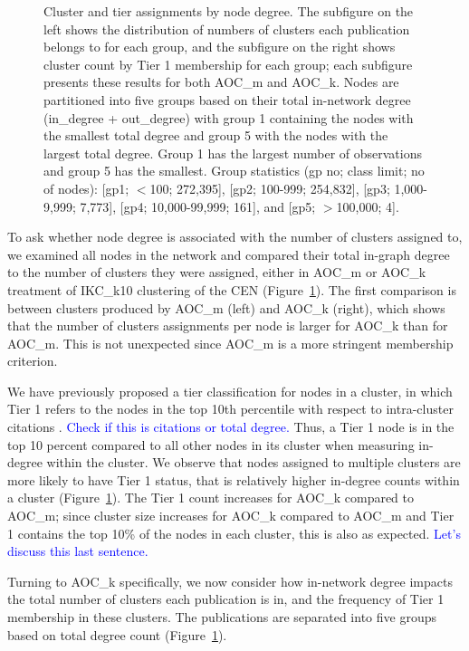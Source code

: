 \documentclass[12pt, oneside]{article}   	%
\begin{document}
\begin{figure}[H]
\begin{subfigure}[t]{0.48\textwidth}
    	\end{subfigure}
\captionsetup{width=0.9\textwidth}	
\caption{Cluster and tier assignments by node degree. The subfigure on the left shows the distribution of numbers of clusters each publication belongs to for each group, and the subfigure on the right shows cluster count by Tier 1 membership for each group; each subfigure presents these results for both AOC\_m and AOC\_k. Nodes are partitioned into five groups based on their total in-network degree (in\_degree + out\_degree) with group 1 containing the nodes with the smallest total degree and group 5 with the nodes with the largest total degree. Group 1 has the largest number of observations and group 5 has the smallest. Group statistics (gp no; class limit; no of nodes): [gp1; $<$100;  272,395], [gp2; 100-999; 254,832], [gp3; 1,000-9,999; 7,773], [gp4; 10,000-99,999; 161], and [gp5; $>$100,000; 4]. }
\label{fig:fig3}
\end{figure}


To ask whether node degree is associated with the number of clusters assigned to, we examined all nodes in the network and compared their total in-graph degree to the number of clusters they were assigned, either in AOC\_m or AOC\_k treatment of IKC\_k10 clustering of the CEN (Figure~\ref{fig:fig3}). The first comparison is between clusters produced by AOC\_m (left) and AOC\_k (right), which shows that the number of clusters assignments per node is larger for AOC\_k than for AOC\_m. This is not unexpected since AOC\_m is a more stringent membership criterion. 

We have previously proposed a tier classification for nodes in a cluster, in which Tier 1 refers to the nodes in the top 10th percentile with respect to intra-cluster citations \citep{Chandrasekharan2021}. 
\textcolor{blue}{Check if this is citations or total degree.}
Thus, a Tier 1 node is in the top 10 percent compared to all other nodes in its cluster when measuring in-degree within the cluster. We observe that nodes assigned to multiple clusters are more likely to have Tier 1 status, that is relatively higher in-degree counts within a cluster (Figure~\ref{fig:fig3}). The Tier 1 count increases for AOC\_k compared to AOC\_m; since cluster size  increases for AOC\_k compared to AOC\_m and Tier 1 contains the top 10\% of the nodes in each cluster, this is also as expected. \textcolor{blue}{Let's discuss this last sentence.}

Turning to AOC\_k specifically, we now consider how in-network degree impacts the total number of clusters each publication is in, and the frequency of Tier 1 membership in these clusters.
The publications are separated  into five groups based on total degree count (Figure~\ref{fig:fig3}).
\end{document}
